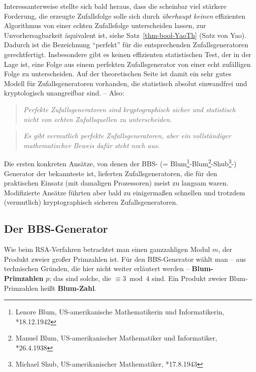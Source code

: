\begin{refsegment}
Interessanterweise stellte sich bald heraus, dass die scheinbar viel
stärkere Forderung, die erzeugte Zufallsfolge solle sich durch
{\em überhaupt keinen} effizienten Algorithmus von einer echten
Zufallsfolge unterscheiden lassen, zur
Unvorhersagbarkeit äquivalent
ist, siehe Satz~\ref{thm-bool-YaoTh} (Satz von Yao). Dadurch ist
die Bezeichnung "`perfekt"' für die entsprechenden Zufallsgeneratoren
gerechtfertigt. Insbesondere gibt es keinen effizienten
statistischen Test,
der in der Lage ist, eine Folge aus einem perfekten Zufallsgenerator
von einer echt zufälligen Folge zu unterscheiden.
Auf der theoretischen Seite ist damit ein sehr gutes Modell
für Zufallsgeneratoren vorhanden, die statistisch absolut einwandfrei und
kryptologisch unangreifbar sind. -- Also:
\begin{quote}
   {\em Perfekte
   Zufallsgeneratoren
   sind kryptographisch sicher
   und statistisch nicht von echten Zufallsquellen zu unterscheiden.}
\end{quote}
\begin{quote}
   {\em Es gibt vermutlich perfekte Zufallsgeneratoren, aber ein
   vollständiger mathematischer Beweis dafür steht noch aus.}
\end{quote}

Die ersten konkreten Ansätze, von denen der BBS- (= Blum\footnote{%
Lenore Blum, US-amerikanische Mathematikerin und Informatikerin, *18.12.1942
}-Blum\footnote{%
Manuel Blum, US-amerikanischer Mathematiker und Informatiker, *26.4.1938
}-Shub\footnote{%
Michael Shub, US-amerikanischer Mathematiker, *17.8.1943
}-)
Generator der bekannteste ist, lieferten Zufallsgeneratoren, die für den
praktischen Einsatz (mit damaligen Prozessoren) meist zu langsam waren.
Modifizierte Ansätze führten aber bald zu einigermaßen schnellen und
trotzdem (vermutlich) kryptographisch sicheren Zufallsgeneratoren.

\subsection{Der BBS-Generator}\label{ss-bool-bbs}

Wie beim RSA-Verfahren betrachtet man einen ganzzahligen Modul $m$, der
Produkt zweier großer Primzahlen ist. Für den BBS-Generator wählt man
-- aus technischen Gründen, die hier nicht weiter erläutert werden --
{\bf Blum-Primzahlen} $p$; das sind solche, die $\equiv 3 \bmod 4$
sind. Ein Produkt zweier Blum-Primzahlen heißt {\bf Blum-Zahl}.


\end{refsegment}
